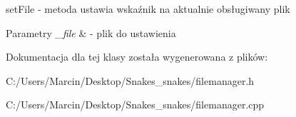 set\+File -\/ metoda ustawia wskaźnik na aktualnie obsługiwany plik 


\begin{DoxyParams}{Parametry}
{\em \+\_\+file} & -\/ plik do ustawienia \\
\hline
\end{DoxyParams}


Dokumentacja dla tej klasy została wygenerowana z plików\+:\begin{DoxyCompactItemize}
\item 
C\+:/\+Users/\+Marcin/\+Desktop/\+Snakes\+\_\+snakes/filemanager.\+h\item 
C\+:/\+Users/\+Marcin/\+Desktop/\+Snakes\+\_\+snakes/filemanager.\+cpp\end{DoxyCompactItemize}
